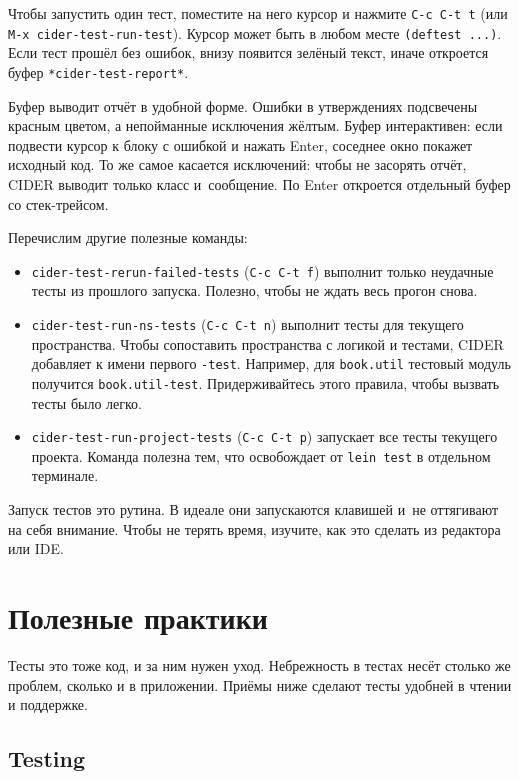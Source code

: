 Чтобы запустить один тест, поместите на него курсор и нажмите \verb|C-c C-t t|
(или \verb|M-x cider-test-run-test|). Курсор может быть в любом месте
\verb|(deftest ...)|. Если тест прошёл без ошибок, внизу появится зелёный
текст, иначе откроется буфер \verb|*cider-test-report*|.

Буфер выводит отчёт в удобной форме. Ошибки в утверждениях подсвечены красным
цветом, а непойманные исключения жёлтым. Буфер интерактивен: если подвести
курсор к блоку с ошибкой и нажать Enter, соседнее окно покажет исходный код. То
же самое касается исключений: чтобы не засорять отчёт, CIDER выводит только
класс и~сообщение. По Enter откроется отдельный буфер со стек-трейсом.

Перечислим другие полезные команды:

\begin{itemize}

\item
  \verb|cider-test-rerun-failed-tests| (\verb|C-c C-t f|) выполнит только
  неудачные тесты из прошлого запуска. Полезно, чтобы не ждать весь прогон
  снова.

\item
  \verb|cider-test-run-ns-tests| (\verb|C-c C-t n|) выполнит тесты для текущего
  пространства. Чтобы сопоставить пространства с логикой и тестами, CIDER
  добавляет к имени первого \verb|-test|. Например, для \verb|book.util|
  тестовый модуль получится \verb|book.util-test|. Придерживайтесь этого
  правила, чтобы вызвать тесты было легко.

\item
  \verb|cider-test-run-project-tests| (\verb|C-c C-t p|) запускает все тесты
  текущего проекта. Команда полезна тем, что освобождает от \verb|lein test| в
  отдельном терминале.

\end{itemize}

Запуск тестов это рутина. В идеале они запускаются клавишей и~не оттягивают на
себя внимание. Чтобы не терять время, изучите, как это сделать из редактора или
IDE.

\section{Полезные практики}

Тесты это тоже код, и за ним нужен уход. Небрежность в тестах несёт столько же
проблем, сколько и в приложении. Приёмы ниже сделают тесты удобней в чтении и
поддержке.

\subsection{Testing}

